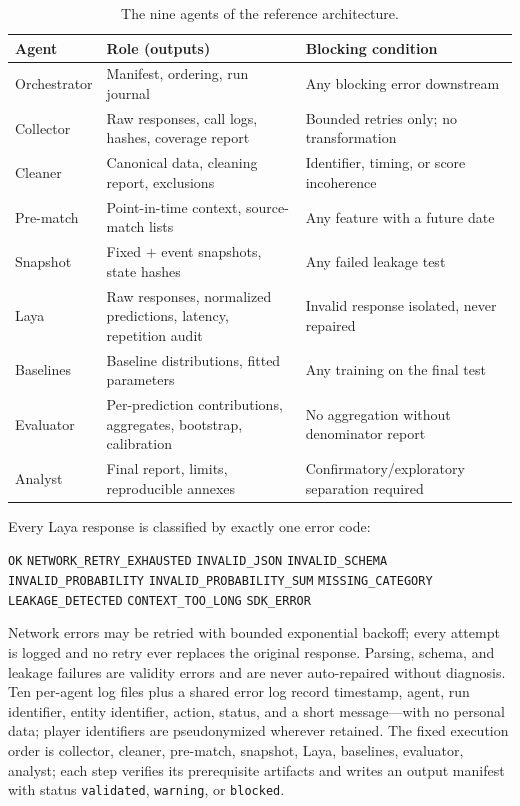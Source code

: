 \documentclass[11pt]{article}
\begin{document}
\begin{table}[t]
\centering
\small
\begin{tabular}{@{}p{3.4cm}p{5.6cm}p{5.4cm}@{}}
\toprule
\textbf{Agent} & \textbf{Role (outputs)} & \textbf{Blocking condition} \\
\midrule
Orchestrator & Manifest, ordering, run journal & Any blocking error downstream \\
Collector & Raw responses, call logs, hashes, coverage report & Bounded retries only; no transformation \\
Cleaner & Canonical data, cleaning report, exclusions & Identifier, timing, or score incoherence \\
Pre-match & Point-in-time context, source-match lists & Any feature with a future date \\
Snapshot & Fixed $+$ event snapshots, state hashes & Any failed leakage test \\
Laya & Raw responses, normalized predictions, latency, repetition audit & Invalid response isolated, never repaired \\
Baselines & Baseline distributions, fitted parameters & Any training on the final test \\
Evaluator & Per-prediction contributions, aggregates, bootstrap, calibration & No aggregation without denominator report \\
Analyst & Final report, limits, reproducible annexes & Confirmatory/exploratory separation required \\
\bottomrule
\end{tabular}
\caption{The nine agents of the reference architecture.}
\label{tab:agents}
\end{table}

Every Laya response is classified by exactly one error code:
\begin{center}
\small
\texttt{OK} \textbullet{} \texttt{NETWORK\_RETRY\_EXHAUSTED} \textbullet{}
\texttt{INVALID\_JSON} \textbullet{} \texttt{INVALID\_SCHEMA}\\
\texttt{INVALID\_PROBABILITY} \textbullet{} \texttt{INVALID\_PROBABILITY\_SUM}
\textbullet{} \texttt{MISSING\_CATEGORY}\\
\texttt{LEAKAGE\_DETECTED} \textbullet{} \texttt{CONTEXT\_TOO\_LONG}
\textbullet{} \texttt{SDK\_ERROR}
\end{center}
\noindent Network errors may be retried with bounded exponential
backoff; every attempt is logged and no retry ever replaces the original
response. Parsing, schema, and leakage failures are validity errors and are
never auto-repaired without diagnosis. Ten per-agent log files plus a shared
error log record timestamp, agent, run identifier, entity identifier, action,
status, and a short message---with no personal data; player identifiers are
pseudonymized wherever retained. The fixed execution order is collector,
cleaner, pre-match, snapshot, Laya, baselines, evaluator, analyst; each step
verifies its prerequisite artifacts and writes an output manifest with status
\texttt{validated}, \texttt{warning}, or \texttt{blocked}.
\end{document}
